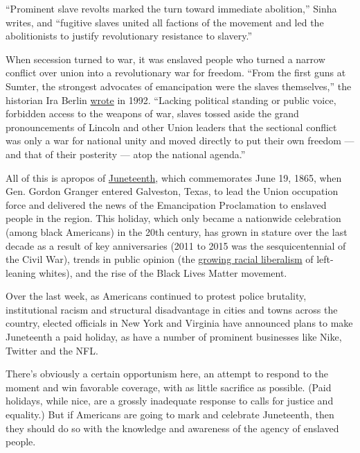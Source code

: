 ``Prominent slave revolts marked the turn toward immediate abolition,''
Sinha writes, and ``fugitive slaves united all factions of the movement
and led the abolitionists to justify revolutionary resistance to
slavery.''

When secession turned to war, it was enslaved people who turned a narrow
conflict over union into a revolutionary war for freedom. ``From the
first guns at Sumter, the strongest advocates of emancipation were the
slaves themselves,'' the historian Ira Berlin
\href{https://www.washingtonpost.com/archive/opinions/1992/12/27/how-the-slaves-freed-themselves/7d58b82c-3446-4f96-a07d-52fc868eb960/}{wrote}
in 1992. ``Lacking political standing or public voice, forbidden access
to the weapons of war, slaves tossed aside the grand pronouncements of
Lincoln and other Union leaders that the sectional conflict was only a
war for national unity and moved directly to put their own freedom ---
and that of their posterity --- atop the national agenda.''

All of this is apropos of
\href{https://www.nytimes3xbfgragh.onion/interactive/2020/06/18/style/juneteenth-celebration.html}{Juneteenth},
which commemorates June 19, 1865, when Gen. Gordon Granger entered
Galveston, Texas, to lead the Union occupation force and delivered the
news of the Emancipation Proclamation to enslaved people in the region.
This holiday, which only became a nationwide celebration (among black
Americans) in the 20th century, has grown in stature over the last
decade as a result of key anniversaries (2011 to 2015 was the
sesquicentennial of the Civil War), trends in public opinion (the
\href{https://www.vox.com/2019/3/22/18259865/great-awokening-white-liberals-race-polling-trump-2020}{growing
racial liberalism} of left-leaning whites), and the rise of the Black
Lives Matter movement.

Over the last week, as Americans continued to protest police brutality,
institutional racism and structural disadvantage in cities and towns
across the country, elected officials in New York and Virginia have
announced plans to make Juneteenth a paid holiday, as have a number of
prominent businesses like Nike, Twitter and the NFL.

There's obviously a certain opportunism here, an attempt to respond to
the moment and win favorable coverage, with as little sacrifice as
possible. (Paid holidays, while nice, are a grossly inadequate response
to calls for justice and equality.) But if Americans are going to mark
and celebrate Juneteenth, then they should do so with the knowledge and
awareness of the agency of enslaved people.

